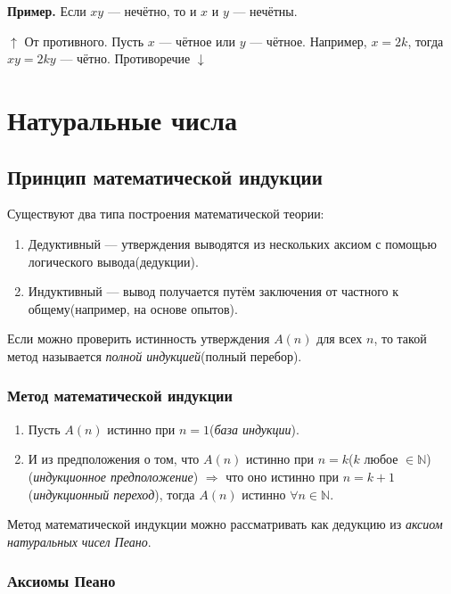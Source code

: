 \documentclass{article}
\begin{document}
    \textbf{Пример.} Если \(xy\) --- нечётно, то и \(x\) и \(y\) --- нечётны.

    \(\uparrow\) От противного. Пусть \(x\) --- чётное или \(y\) --- чётное. Например, \(x = 2k\), тогда \(xy = 2ky\) --- чётно. Противоречие \(\downarrow\)

    \section{Натуральные числа}

    \subsection{Принцип математической индукции}

    Существуют два типа построения математической теории:
    \begin{enumerate}
        \item Дедуктивный --- утверждения выводятся из нескольких аксиом с помощью логического вывода(дедукции).
        \item Индуктивный --- вывод получается путём заключения от частного к общему(например, на основе опытов).
    \end{enumerate}

    Если можно проверить истинность утверждения \(A(n)\) для всех \(n\), то такой метод называется \textit{полной индукцией}(полный перебор).

    \subsubsection{Метод математической индукции}

    \begin{enumerate}
        \item Пусть \(A(n)\) истинно при \(n=1\)(\textit{база индукции}).
        \item И из предположения о том, что \(A(n)\) истинно при \(n=k\)(\(k\) любое \(\in \mathbb{N}\))(\textit{индукционное предположение}) \(\Rightarrow\) что оно истинно при \(n=k+1\)(\textit{индукционный переход}), тогда \(A(n)\) истинно \(\forall n \in \mathbb{N}\).
    \end{enumerate}

    Метод математической индукции можно рассматривать как дедукцию из \textit{аксиом натуральных чисел Пеано}.

    \subsubsection{Аксиомы Пеано}
\end{document}
